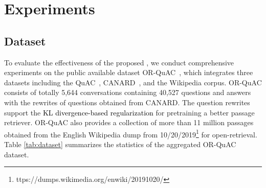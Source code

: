 \section{Experiments}\label{sec:exp}
\subsection{Dataset}
To evaluate the effectiveness of the proposed {\modelname}, we conduct comprehensive experiments on the public available dataset OR-QuAC~\cite{qu2020open}, which integrates three datasets including the QuAC~\cite{choi2018quac}, CANARD~\cite{elgohary2019can}, and the Wikipedia corpus.
OR-QuAC consists of totally 5,644 conversations containing 40,527 questions and answers with the rewrites of questions obtained from CANARD. The question rewrites support the \textcolor{black}{KL divergence-based regularization} for pretraining a better passage retriever. 
OR-QuAC also provides a collection of more than 11 million passages obtained from the English Wikipedia dump from 10/20/2019\footnote{ttps://dumps.wikimedia.org/enwiki/20191020/} for open-retrieval.
Table \ref{tab:dataset} summarizes the statistics of the aggregated OR-QuAC dataset. 


